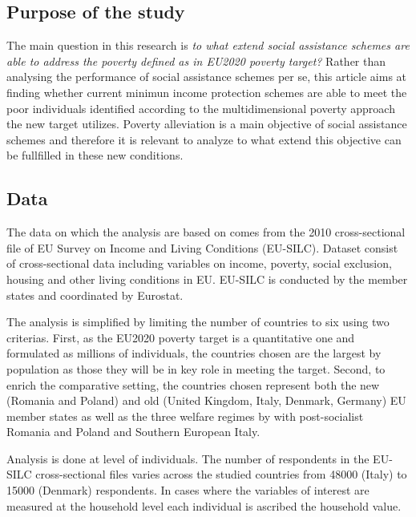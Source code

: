 \documentclass[11pt, a4paper]{article}\usepackage{graphicx, color}
\begin{document}
\subsection{Purpose of the study}

The main question in this research is \emph{to what extend social assistance schemes are able to address the poverty defined as in EU2020 poverty target?} Rather than analysing the performance of social assistance schemes per se, this article aims at finding whether current minimun income protection schemes are able to meet the poor individuals identified according to the multidimensional poverty approach the new target utilizes. Poverty alleviation is a main objective of social assistance schemes and therefore it is relevant to analyze to what extend this objective can be fullfilled in these new conditions.

\subsection{Data}

The data on which the analysis are based on comes from the 2010 cross-sectional file of EU Survey on Income and Living Conditions (EU-SILC). Dataset consist of cross-sectional data including variables on income, poverty, social exclusion, housing and other living conditions in EU. EU-SILC is conducted by the member states and coordinated by Eurostat. 

The analysis is simplified by limiting the number of countries to six using two criterias. First, as the EU2020 poverty target is a quantitative one and formulated as millions of individuals, the countries chosen are the largest by population as those they will be in key role in meeting the target. Second, to enrich the comparative setting, the countries chosen represent both the new (Romania and Poland) and old (United Kingdom, Italy, Denmark, Germany) EU member states as well as the three welfare regimes by \citet{esping-andersen_three_1990} with post-socialist Romania and Poland and Southern European Italy.

Analysis is done at level of individuals. The number of respondents in the EU-SILC cross-sectional files varies across the studied countries from 48000 (Italy) to 15000 (Denmark) respondents. In cases where the variables of interest are measured at the household level each individual is ascribed the household value. 

\end{document}
